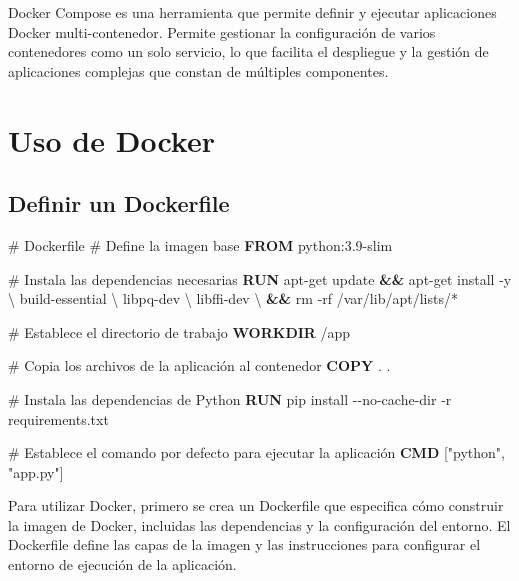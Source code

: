 \documentclass[
  a4paper,
  DIV=11,
  numbers=noendperiod,
  onepage,
  openany]{scrreprt}
\newenvironment{Shaded}{\begin{snugshade}}{\end{snugshade}}
\newcommand{\AttributeTok}[1]{\textcolor[rgb]{0.40,0.45,0.13}{#1}}
\newcommand{\CommentTok}[1]{\textcolor[rgb]{0.37,0.37,0.37}{#1}}
\newcommand{\DataTypeTok}[1]{\textcolor[rgb]{0.68,0.00,0.00}{#1}}
\newcommand{\ExtensionTok}[1]{\textcolor[rgb]{0.00,0.23,0.31}{#1}}
\newcommand{\FunctionTok}[1]{\textcolor[rgb]{0.28,0.35,0.67}{#1}}
\newcommand{\KeywordTok}[1]{\textcolor[rgb]{0.00,0.23,0.31}{\textbf{#1}}}
\newcommand{\NormalTok}[1]{\textcolor[rgb]{0.00,0.23,0.31}{#1}}
\newcommand{\PreprocessorTok}[1]{\textcolor[rgb]{0.68,0.00,0.00}{#1}}
\newcommand{\StringTok}[1]{\textcolor[rgb]{0.13,0.47,0.30}{#1}}
\begin{document}
Docker Compose es una herramienta que permite definir y ejecutar
aplicaciones Docker multi-contenedor. Permite gestionar la configuración
de varios contenedores como un solo servicio, lo que facilita el
despliegue y la gestión de aplicaciones complejas que constan de
múltiples componentes.

\chapter{Uso de Docker 🐋}\label{uso-de-docker}

\section{Definir un Dockerfile 📘}\label{definir-un-dockerfile}

\begin{Shaded}
\begin{Highlighting}[]
\CommentTok{\# Dockerfile}
\CommentTok{\# Define la imagen base}
\KeywordTok{FROM}\NormalTok{ python:3.9{-}slim}

\CommentTok{\# Instala las dependencias necesarias}
\KeywordTok{RUN} \ExtensionTok{apt{-}get}\NormalTok{ update }\KeywordTok{\&\&} \ExtensionTok{apt{-}get}\NormalTok{ install }\AttributeTok{{-}y} \DataTypeTok{\textbackslash{}}
\NormalTok{    build{-}essential }\DataTypeTok{\textbackslash{}}
\NormalTok{    libpq{-}dev }\DataTypeTok{\textbackslash{}}
\NormalTok{    libffi{-}dev }\DataTypeTok{\textbackslash{}}
    \KeywordTok{\&\&} \FunctionTok{rm} \AttributeTok{{-}rf}\NormalTok{ /var/lib/apt/lists/}\PreprocessorTok{*}

\CommentTok{\# Establece el directorio de trabajo}
\KeywordTok{WORKDIR}\NormalTok{ /app}

\CommentTok{\# Copia los archivos de la aplicación al contenedor}
\KeywordTok{COPY}\NormalTok{ . .}

\CommentTok{\# Instala las dependencias de Python}
\KeywordTok{RUN} \ExtensionTok{pip}\NormalTok{ install }\AttributeTok{{-}{-}no{-}cache{-}dir} \AttributeTok{{-}r}\NormalTok{ requirements.txt}

\CommentTok{\# Establece el comando por defecto para ejecutar la aplicación}
\KeywordTok{CMD}\NormalTok{ [}\StringTok{"python"}\NormalTok{, }\StringTok{"app.py"}\NormalTok{]}
\end{Highlighting}
\end{Shaded}

Para utilizar Docker, primero se crea un Dockerfile que especifica cómo
construir la imagen de Docker, incluidas las dependencias y la
configuración del entorno. El Dockerfile define las capas de la imagen y
las instrucciones para configurar el entorno de ejecución de la
aplicación.
\end{document}
